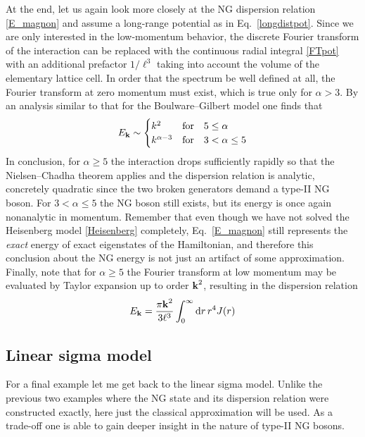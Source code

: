 \documentclass[final,3p,times,12pt,a4paper,sort&compress]{elsarticle}
\newcommand\vek[1]{{\boldsymbol{\bf #1}}}   %
\newcommand\dd{\mathop{{\rm d}\!}\nolimits} %
\begin{document}
At the end, let us again look more closely at the NG dispersion relation
\eqref{E_magnon} and assume a long-range potential as in
Eq.~\eqref{longdistpot}. Since we are only interested in the low-momentum
behavior, the discrete Fourier transform of the interaction can be replaced
with the continuous radial integral \eqref{FTpot} with an additional prefactor
$1/\ell^3$ taking into account the volume of the elementary lattice cell. In
order that the spectrum be well defined at all, the Fourier transform at zero
momentum must exist, which is true only for $\alpha>3$. By an analysis similar
to that for the Boulware--Gilbert model one finds that
\begin{equation}
E_{\vek k}\sim
\begin{cases}
k^2 & \text{for}\quad5\leq\alpha\\
k^{\alpha-3} & \text{for}\quad3<\alpha\leq 5
\end{cases}
\end{equation}
In conclusion, for $\alpha\geq5$ the interaction drops sufficiently rapidly so
that the Nielsen--Chadha theorem applies and the dispersion relation is
analytic, concretely quadratic since the two broken generators demand a
type-II NG boson. For $3<\alpha\leq5$ the NG boson still exists, but its energy
is once again nonanalytic in momentum. Remember that even though we have not
solved the Heisenberg model \eqref{Heisenberg} completely, Eq.~\eqref{E_magnon}
still represents the \emph{exact} energy of exact eigenstates of the
Hamiltonian, and therefore this conclusion about the NG energy is not just an
artifact of some approximation. Finally, note that for $\alpha\geq5$ the
Fourier transform at low momentum may be evaluated by Taylor expansion up to
order $\vek k^2$, resulting in the dispersion relation
\begin{equation}
E_{\vek k}=\frac{\pi\vek k^2}{3\ell^3}\int_0^\infty\dd r\,r^4J(r)
\end{equation}


\subsection{Linear sigma model}
For a final example let me get back to the linear sigma model. Unlike the
previous two examples where the NG state and its dispersion relation were
constructed exactly, here just the classical approximation will be
used. As a trade-off one is able to gain deeper insight in the nature of type-II
NG bosons.
\end{document}
